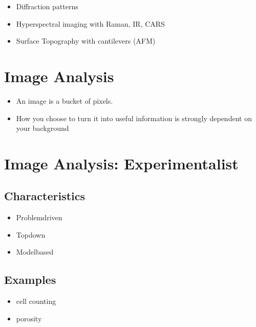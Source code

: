 \documentclass[letterpaper,10pt,english]{sphinxmanual}
\begin{document}
\begin{itemize}
\item {} 
\sphinxAtStartPar
Diffraction patterns

\item {} 
\sphinxAtStartPar
Hyperspectral imaging with Raman, IR, CARS

\item {} 
\sphinxAtStartPar
Surface Topography with cantilevers (AFM)

\end{itemize}




\section{Image Analysis}
\label{\detokenize{01-Introduction:image-analysis}}

\begin{itemize}
\item {} 
\sphinxAtStartPar
An image is a bucket of pixels.

\item {} 
\sphinxAtStartPar
How you choose to turn it into useful information is strongly dependent on your background

\end{itemize}


\section{Image Analysis: Experimentalist}
\label{\detokenize{01-Introduction:image-analysis-experimentalist}}



\subsection{Characteristics}
\label{\detokenize{01-Introduction:characteristics}}\begin{itemize}
\item {} 
\sphinxAtStartPar
Problem\sphinxhyphen{}driven

\item {} 
\sphinxAtStartPar
Top\sphinxhyphen{}down

\item {} 
\sphinxAtStartPar
{} Model\sphinxhyphen{}based

\end{itemize}


\subsection{Examples}
\label{\detokenize{01-Introduction:examples}}\begin{itemize}
\item {} 
\sphinxAtStartPar
cell counting

\item {} 
\sphinxAtStartPar
porosity

\end{itemize}
\end{document}
